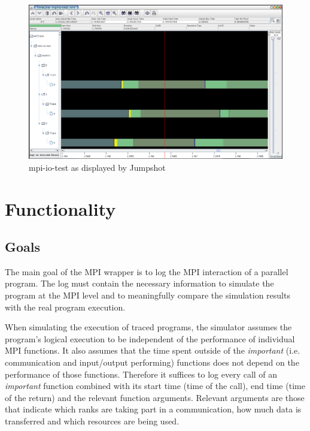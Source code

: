 \documentclass[a4paper,12pt,pdftex]{scrartcl}
\begin{document}
\begin{figure}[h]
  \centering
  \includegraphics[scale=1]{img/jumpshot}
  \caption{mpi-io-test as displayed by Jumpshot}
  \label{fig:jumpshot}
\end{figure}


\section{Functionality}

\subsection{Goals}
The main goal of the MPI wrapper is to log the MPI interaction of a
parallel program. The log must contain the necessary information to
simulate the program at the MPI level and to meaningfully compare the
simulation results with the real program execution.  

When simulating the execution of traced programs, the simulator
assumes the program's logical execution to be independent of the
performance of individual MPI functions. It also assumes that the time
spent outside of the \emph{important} (i.e. communication and
input/output performing) functions does not depend on the performance
of those functions. Therefore it suffices to log every call of an
\emph{important} function combined with its start time (time of the
call), end time (time of the return) and the relevant function
arguments. Relevant arguments are those that indicate which ranks are
taking part in a communication, how much data is transferred and which
resources are being used.
\end{document}

